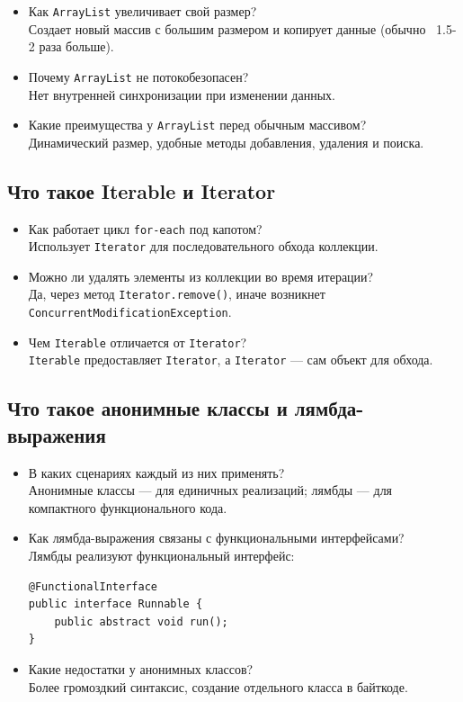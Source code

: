 \documentclass[a4paper,14pt]{article}
\begin{document}
\begin{itemize}
    \item Как \texttt{ArrayList} увеличивает свой размер? \\
    Создает новый массив с большим размером и копирует данные (обычно ~1.5-2 раза больше).
    \item Почему \texttt{ArrayList} не потокобезопасен? \\
    Нет внутренней синхронизации при изменении данных.
    \item Какие преимущества у \texttt{ArrayList} перед обычным массивом? \\
    Динамический размер, удобные методы добавления, удаления и поиска.
\end{itemize}

\subsection{Что такое Iterable и Iterator}

\begin{itemize}
    \item Как работает цикл \texttt{for-each} под капотом? \\
    Использует \texttt{Iterator} для последовательного обхода коллекции.
    \item Можно ли удалять элементы из коллекции во время итерации? \\
    Да, через метод \texttt{Iterator.remove()}, иначе возникнет \texttt{ConcurrentModificationException}.
    \item Чем \texttt{Iterable} отличается от \texttt{Iterator}? \\
    \texttt{Iterable} предоставляет \texttt{Iterator}, а \texttt{Iterator} — сам объект для обхода.
\end{itemize}

\subsection{Что такое анонимные классы и лямбда-выражения}

\begin{itemize}
    \item В каких сценариях каждый из них применять? \\
    Анонимные классы — для единичных реализаций; лямбды — для компактного функционального кода.
    \item Как лямбда-выражения связаны с функциональными интерфейсами? \\
    Лямбды реализуют функциональный интерфейс:
\begin{lstlisting}[style=javastyle]
@FunctionalInterface
public interface Runnable {
    public abstract void run();
}
\end{lstlisting}
    \item Какие недостатки у анонимных классов? \\
    Более громоздкий синтаксис, создание отдельного класса в байткоде.
\end{itemize}
\end{document}
